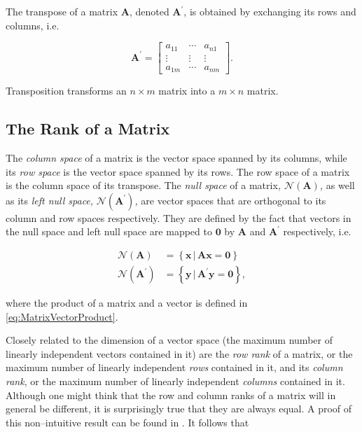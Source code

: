 \documentclass[graybox,envcountchap,sectrefs]{svmono}\usepackage[]{graphicx}\usepackage[]{xcolor}
\begin{document}
\begin{appendices}
The transpose of a matrix $\mathrm{\mathbf{A}}$, denoted $\mathrm{\mathbf{A}}^{\prime}$,
is obtained by exchanging its rows and columns, i.e.

\begin{equation}
\mathrm{\mathbf{A}}^{\prime}=\left[\begin{array}{ccc}
a_{11} & \cdots & a_{n1}\\
\vdots & \vdots & \vdots\\
a_{1m} & \cdots & a_{nm}
\end{array}\right].\label{eq:Atranspose}
\end{equation}

Transposition transforms an $n\times m$ matrix into a $m\times n$
matrix.

\subsection{The Rank of a Matrix}

The \emph{column space} of a matrix is the vector space spanned by
its columns, while its \emph{row space} is the vector space spanned
by its rows. The row space of a matrix is the column space of its
transpose. The \emph{null space }of a matrix\emph{, $\mathcal{{N}}(\mathrm{\mathbf{A}})$,}
as well as its \emph{left null space,} \emph{$\mathcal{{N}}(\mathrm{\mathbf{A}^{\prime}})$,}
are vector spaces that are orthogonal to its column and row spaces
respectively. They are defined by the fact that vectors in the null
space and left null space are mapped to $\mathbf{0}$ by $\mathrm{\mathbf{A}}$
and $\mathrm{\mathbf{A}}^{\prime}$ respectively, i.e.

\begin{subequations}
\begin{align}
\mathcal{{N}}\left(\mathrm{\mathbf{A}}\right) & =\left\{ \mathrm{\mathbf{x}}\,|\,\mathrm{\mathbf{A}}\mathrm{\mathbf{x}}=\mathrm{\mathbf{0}}\right\} \label{eq:NullSpace}\\
\mathcal{{N}}\left(\mathrm{\mathbf{A}}^{\prime}\right) & =\left\{ \mathrm{\mathbf{y}}\,|\,\mathrm{\mathbf{A}}^{\prime}\mathrm{\mathbf{y}}=\mathrm{\mathbf{0}}\right\} ,\label{eq:LeftNullSpace}
\end{align}
\end{subequations}

where the product of a matrix and a vector is defined in \eqref{eq:MatrixVectorProduct}.

Closely related to the dimension of a vector space (the maximum number
of linearly independent vectors contained in it) are the \emph{row
rank} of a matrix, or the maximum number of linearly independent \emph{rows}
contained in it, and its \emph{column rank}, or the maximum number
of linearly independent \emph{columns} contained in it. Although one
might think that the row and column ranks of a matrix will in general
be different, it is surprisingly true that they are always equal.
A proof of this non--intuitive result can be found in \citet{Gentle2017}.
It follows that 


\end{appendices}
\end{document}
